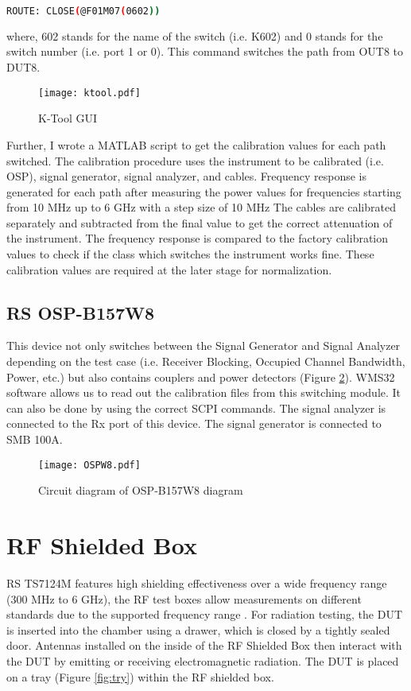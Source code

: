 \begin{lstlisting}[language=bash]
ROUTE: CLOSE(@F01M07(0602))
\end{lstlisting}

where, 602 stands for the name of the switch (i.e. K602) and 0 stands for the switch number (i.e. port 1 or 0). This command switches the path from OUT8 to DUT8. 

\begin{figure}[H]
\centering
\texttt{[image: ktool.pdf]}
\caption{K-Tool \acs{GUI}}
\label{fig:ktool}
\end{figure}

Further, I wrote a MATLAB\textregistered{} script to get the calibration values for each path switched. The calibration procedure uses the instrument to be calibrated (i.e. \acs{OSP}), signal generator, signal analyzer, and cables. Frequency response is generated for each path after measuring the power values for frequencies starting from 10 MHz up to 6 GHz with a step size of 10 MHz The cables are calibrated separately and subtracted from the final value to get the correct attenuation of the instrument. The frequency response is compared to the factory calibration values to check if the class which switches the instrument works fine. These calibration values are required at the later stage for normalization.

\subsection{\acs{RS}\textregistered{} \ac{OSP}-B157W8}
This device not only switches between the Signal Generator and Signal Analyzer depending on the test case (i.e. Receiver Blocking, Occupied Channel Bandwidth, Power, etc.) but also contains couplers and power detectors (Figure \ref{fig:ospw8}). WMS32 software allows us to read out the calibration files from this switching module. It can also be done by using the correct \acs{SCPI} commands. The signal analyzer is connected to the Rx port of this device. The signal generator is connected to SMB 100A.

\begin{figure}[H]
\centering
\texttt{[image: OSPW8.pdf]}
\caption{Circuit diagram of \acs{OSP}-B157W8 diagram \cite{ospw8}}
\label{fig:ospw8}
\end{figure}



\section{\acs{RF} Shielded Box}
\acs{RS}\textregistered{} TS7124M features high shielding effectiveness over a wide frequency range (300 MHz to 6 GHz), the \acs{RF} test boxes allow measurements on different standards due to the supported frequency range \cite{ts7124}. For radiation testing, the \acs{DUT} is inserted into the chamber using a drawer, which is closed by a tightly sealed door. Antennas installed on the inside of the \acs{RF} Shielded Box then interact with the \acs{DUT} by emitting or receiving electromagnetic radiation. The \acs{DUT} is placed on a tray (Figure \ref{fig:try}) within the \acs{RF} shielded box.


